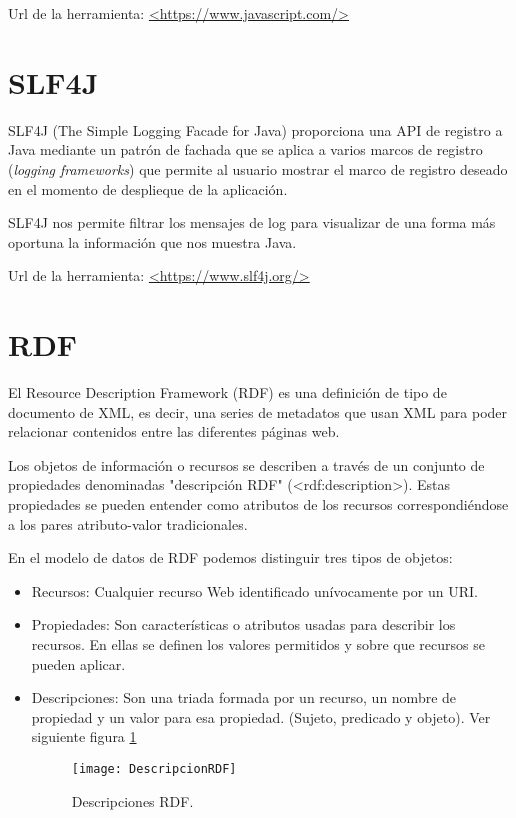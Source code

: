 Url de la herramienta: \url{<https://www.javascript.com/>}

\section{SLF4J}

SLF4J (The Simple Logging Facade for Java) proporciona una API de registro a Java mediante un patrón de fachada que se aplica a varios marcos de registro (\textit{logging frameworks}) que permite al usuario mostrar el marco de registro deseado en el momento de desplieque de la aplicación.

SLF4J nos permite filtrar los mensajes de log para visualizar de una forma más oportuna la información que nos muestra Java.

Url de la herramienta: \url{<https://www.slf4j.org/>}

\section{RDF}

El Resource Description Framework (RDF) es una definición de tipo de documento de XML, es decir, una series de metadatos que usan XML para poder relacionar contenidos entre las diferentes páginas web.

Los objetos de información o recursos se describen a través de un conjunto de propiedades denominadas "descripción RDF" (<rdf:description>). Estas propiedades se pueden entender como atributos de los recursos correspondiéndose a los pares atributo-valor tradicionales.

En el modelo de datos de RDF podemos distinguir tres tipos de objetos:

\begin{itemize}
	\item{Recursos}: Cualquier recurso Web identificado unívocamente por un URI.
	\item{Propiedades}: Son características o atributos usadas para describir los recursos. En ellas se definen los valores permitidos y sobre que recursos se pueden aplicar.
	\item{Descripciones}: Son una triada formada por un recurso, un nombre de propiedad y un valor para esa propiedad. (Sujeto, predicado y objeto).
Ver siguiente figura \ref{figDescripcionRDF}

\begin{figure}[h]
    \begin{center}%
        \begin{center}%
          \texttt{[image: DescripcionRDF]}%
          \caption{Descripciones RDF.}%
          \label{figDescripcionRDF}%
        \end{center}%
  	\end{center}%
\end{figure}%

\end{itemize}

